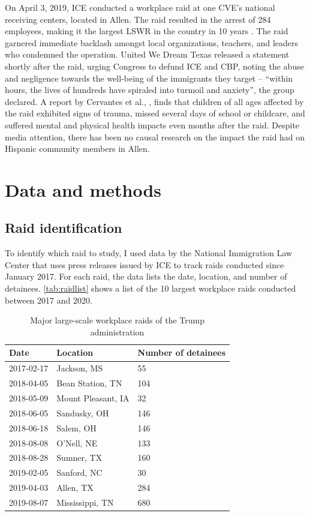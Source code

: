 \documentclass[hidelinks,twoside]{article}
\begin{document}
On April 3, 2019, ICE conducted a workplace raid at one CVE's national receiving centers, located in Allen. The raid resulted in the arrest of 284 employees, making it the largest LSWR in the country in 10 years \citep{usimmigrationandcustomsenforcement_2019_ice}. The raid garnered immediate backlash amongst local organizations, teachers, and leaders who condemned the operation. United We Dream Texas released a statement shortly after the raid, urging Congress to defund ICE and CBP, noting the abuse and negligence towards the well-being of the immigrants they target – “within hours, the lives of hundreds have spiraled into turmoil and anxiety”, the group declared. A report by Cervantes et al., \citeyearpar{cervantes_2020_the}, finds that children of all ages affected by the raid exhibited signs of trauma, missed several days of school or childcare, and suffered mental and physical health impacts even months after the raid. Despite media attention, there has been no causal research on the impact the raid had on Hispanic community members in Allen. 


\section*{Data and methods}
\subsection*{Raid identification}

To identify which raid to study, I used data by the National Immigration Law Center that uses press releases issued by ICE to track raids conducted since January 2017. For each raid, the data lists the date, location, and number of detainees. \autoref{tab:raidlist} shows a list of the 10 largest workplace raids conducted between 2017 and 2020.

\begin{table}[ht]
\caption{Major large-scale workplace raids of the Trump administration}
\centering
\begin{tabular}{lll}
  \hline
Date & Location & Number of detainees \\ 
  \hline
  2017-02-17 & Jackson, MS & 55 \\
2018-04-05 & Bean Station, TN & 104 \\ 
2018-05-09 & Mount Pleasant, IA & 32 \\
2018-06-05 & Sandusky, OH & 146 \\ 
  2018-06-18 & Salem, OH & 146 \\ 
  2018-08-08 & O'Nell, NE & 133 \\ 
  2018-08-28 & Sumner, TX & 160 \\ 
  2019-02-05 & Sanford, NC & 30 \\
  2019-04-03 & Allen, TX & 284 \\ 
  2019-08-07 & Mississippi, TN & 680 \\ 
   \hline
\end{tabular}
\label{tab:raidlist}
\end{table}
\end{document}
